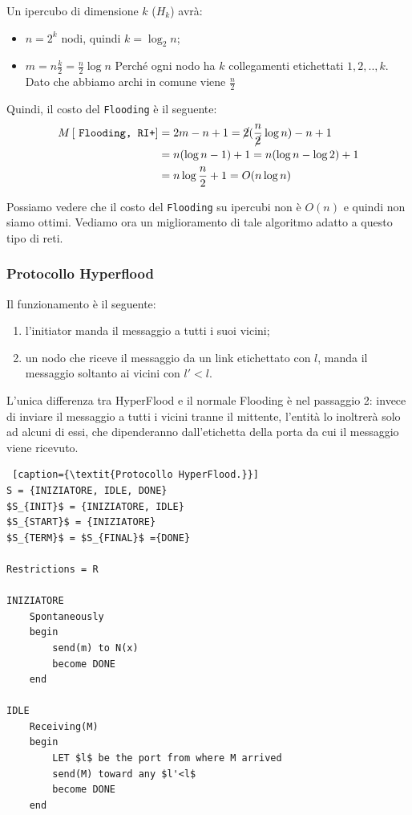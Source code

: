 Un ipercubo di dimensione $k$ ($H_k$) avrà:
\begin{itemize}
    \item $n = 2^k$ nodi, quindi $k = \log_2{n}$;
    \item $m = n \frac{k}{2} = \frac{n}{2} \log n$ Perché ogni nodo ha $k$
          collegamenti etichettati $1,2,..,k$. Dato che abbiamo archi in comune viene
          $\frac{n}{2}$
\end{itemize}

Quindi, il costo del \texttt{Flooding} è il seguente:
\begin{equation*}
    \begin{split}
        M \left[ \text{ \texttt{Flooding, RI+}} \right] & = 2m-n+1
        = \cancel{2}(\frac{n}{\cancel{2}} \log n)-n+1\\
        & = n(\log n -1) +1
        = n(\log n -\log 2) +1\\
        & = n\log{\frac{n}{2}}+1 = O(n \log n)
    \end{split}
\end{equation*}

Possiamo vedere che il costo del \texttt{Flooding} su ipercubi non è $O(n)$ e
quindi non siamo ottimi. Vediamo ora un miglioramento di tale algoritmo adatto a
questo tipo di reti.

\subsubsection{Protocollo Hyperflood}
Il funzionamento è il seguente:
\begin{enumerate}
    \item l'initiator manda il messaggio a tutti i suoi vicini;
    \item un nodo che riceve il messaggio da un link etichettato con $l$, manda il
          messaggio soltanto ai vicini con $l' < l$.
\end{enumerate}
L'unica differenza tra HyperFlood e il normale Flooding è nel passaggio 2:
invece di inviare il messaggio a tutti i vicini tranne il mittente, l'entità lo
inoltrerà solo ad alcuni di essi, che dipenderanno dall'etichetta della porta da
cui il messaggio viene ricevuto.

\begin{lstlisting} [caption={\textit{Protocollo HyperFlood.}}]
S = {INIZIATORE, IDLE, DONE}
$S_{INIT}$ = {INIZIATORE, IDLE}
$S_{START}$ = {INIZIATORE}
$S_{TERM}$ = $S_{FINAL}$ ={DONE}

Restrictions = R

INIZIATORE
    Spontaneously
    begin
        send(m) to N(x)
        become DONE
    end

IDLE
    Receiving(M)
    begin
        LET $l$ be the port from where M arrived
        send(M) toward any $l'<l$
        become DONE
    end
\end{lstlisting}

